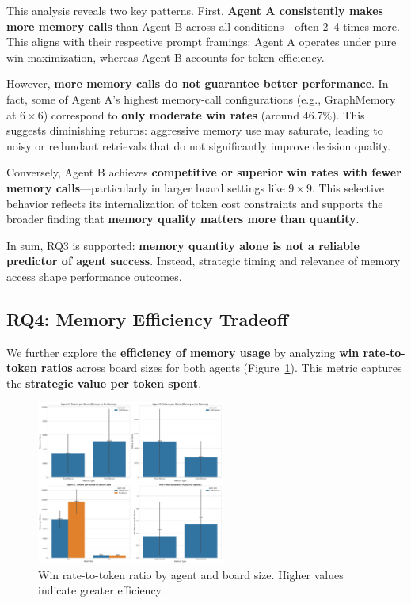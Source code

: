 \documentclass[10pt]{article}
\begin{document}
This analysis reveals two key patterns. First, \textbf{Agent A consistently makes more memory calls} than Agent B across all conditions---often 2--4 times more. This aligns with their respective prompt framings: Agent A operates under pure win maximization, whereas Agent B accounts for token efficiency.

However, \textbf{more memory calls do not guarantee better performance}. In fact, some of Agent A's highest memory-call configurations (e.g., GraphMemory at $6\times6$) correspond to \textbf{only moderate win rates} (around 46.7\%). This suggests diminishing returns: aggressive memory use may saturate, leading to noisy or redundant retrievals that do not significantly improve decision quality.

Conversely, Agent B achieves \textbf{competitive or superior win rates with fewer memory calls}---particularly in larger board settings like $9\times9$. This selective behavior reflects its internalization of token cost constraints and supports the broader finding that \textbf{memory quality matters more than quantity}. 

In sum, RQ3 is supported: \textbf{memory quantity alone is not a reliable predictor of agent success}. Instead, strategic timing and relevance of memory access shape performance outcomes.

\subsection{RQ4: Memory Efficiency Tradeoff}

We further explore the \textbf{efficiency of memory usage} by analyzing \textbf{win rate-to-token ratios} across board sizes for both agents (Figure~\ref{fig:memory_efficiency_tradeoff}). This metric captures the \textbf{strategic value per token spent}.

\begin{figure}[ht]
\centering
\includegraphics[width=0.55\textwidth]{figures/memory_baseline/memory_token_efficiency.png}
\caption{Win rate-to-token ratio by agent and board size. Higher values indicate greater efficiency.}
\label{fig:memory_efficiency_tradeoff}
\end{figure}
\end{document}
